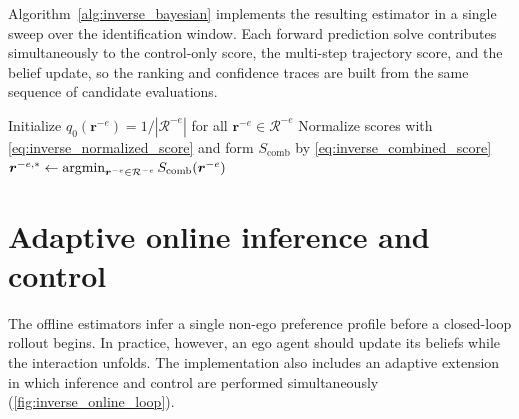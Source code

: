 Algorithm~\ref{alg:inverse_bayesian} implements the resulting estimator in a single sweep over the
identification window. Each forward prediction solve contributes simultaneously to the control-only
score, the multi-step trajectory score, and the belief update, so the ranking and confidence traces
are built from the same sequence of candidate evaluations.

\begin{algorithm}
\medskip
Initialize $q_0(\boldsymbol{r}^{-e}) = 1 / |\mathcal R^{-e}|$ for all $\boldsymbol{r}^{-e} \in \mathcal R^{-e}$\;
Normalize scores with \cref{eq:inverse_normalized_score} and form $S_{\mathrm{comb}}$ by \cref{eq:inverse_combined_score}\;
$\boldsymbol{r}^{-e,*} \gets
\mathop{\textrm{argmin}}_{\boldsymbol{r}^{-e} \in \mathcal R^{-e}} S_{\mathrm{comb}}(\boldsymbol{r}^{-e})$\;
\caption{Multi-step trajectory matching with Bayesian candidate ranking.}
\label{alg:inverse_bayesian}
\end{algorithm}

\section{Adaptive online inference and control}
\label{sec:inverse-online}

The offline estimators infer a single non-ego preference profile before a
closed-loop rollout begins.
In practice, however, an ego agent should update its beliefs while the interaction unfolds.
The implementation also includes an adaptive extension in which inference and control are
performed simultaneously (\cref{fig:inverse_online_loop}).

